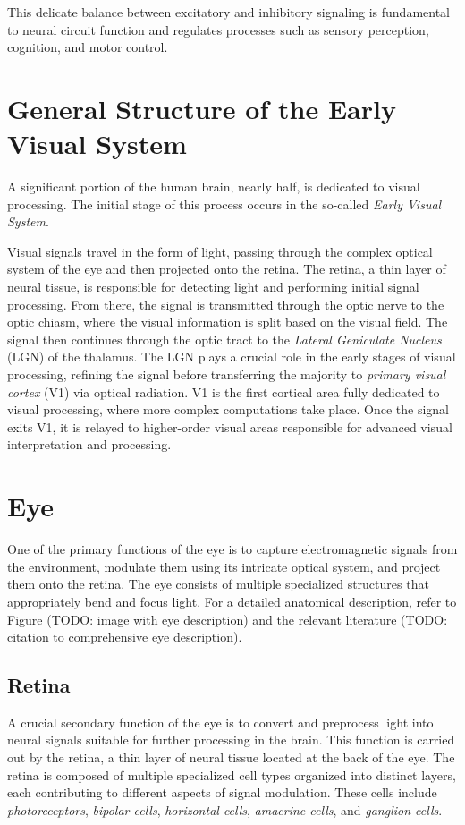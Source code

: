This delicate balance between excitatory and inhibitory signaling is fundamental to neural circuit function and regulates processes such as sensory perception, cognition, and motor control.

\section{General Structure of the Early Visual System}
\label{sec:general_structure}
A significant portion of the human brain, nearly half, is dedicated to visual processing. 
The initial stage of this process occurs in the so-called \emph{Early Visual System}.

Visual signals travel in the form of light, passing through the complex optical
system of the eye and then projected onto the retina. The retina, a thin layer of neural tissue, 
is responsible for detecting light and performing initial signal processing. From there, 
the signal is transmitted through the optic nerve to the optic chiasm, where the visual information
is split based on the visual field. The signal then continues through the optic tract
to the \emph{Lateral Geniculate Nucleus} (LGN) of the thalamus. The LGN plays a crucial role
in the early stages of visual processing, refining the signal before transferring the
majority to \emph{primary visual cortex} (V1) via optical radiation. 
V1 is the first cortical area fully dedicated to visual processing, where more complex
computations take place. Once the signal exits V1, it is relayed to higher-order visual
areas responsible for advanced visual interpretation and processing.

\section{Eye}
\label{sec:eye}
One of the primary functions of the eye is to capture electromagnetic signals from
the environment, modulate them using its intricate optical system, and project them
onto the retina. The eye consists of multiple specialized structures that
appropriately bend and focus light. For a detailed anatomical description, 
refer to Figure (TODO: image with eye description) and the relevant literature
(TODO: citation to comprehensive eye description).

\subsection{Retina}
\label{subsec:retina}
A crucial secondary function of the eye is to convert and preprocess light into
neural signals suitable for further processing in the brain. This function is
carried out by the retina, a thin layer of neural tissue located at the back of
the eye. The retina is composed of multiple specialized cell types organized into
distinct layers, each contributing to different aspects of signal modulation. These
cells include \emph{photoreceptors}, \emph{bipolar cells}, \emph{horizontal cells}, 
\emph{amacrine cells}, and \emph{ganglion cells}.

